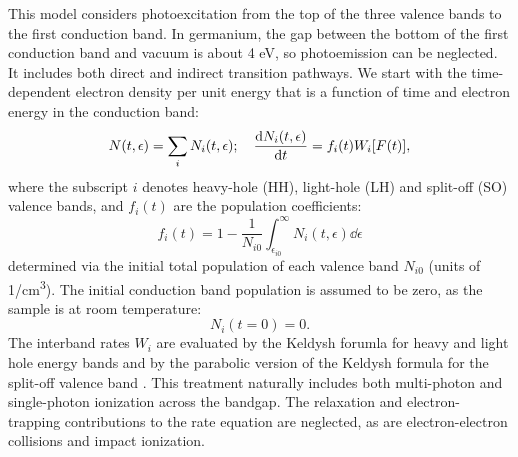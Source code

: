 This model considers photoexcitation from the top of the three valence bands to the first conduction band. In germanium, the gap between the bottom of the first conduction band and vacuum is about 4 eV, so photoemission can be neglected. It includes both direct and indirect transition pathways. We start with the time-dependent electron density per unit energy that is a function of time and electron energy in the conduction band:
\begin{equation}
N(t, \epsilon) = \sum_{i} N_i(t, \epsilon); \quad \dv{N_i(t, \epsilon)}{t} = f_i(t) W_i [F(t)],
\end{equation}
where the subscript $i$ denotes heavy-hole (HH), light-hole (LH) and split-off (SO) valence bands, and $f_i(t)$ are the population coefficients:
\begin{equation}
f_i(t) = 1 - \frac{1}{N_{i0}} \int_{\epsilon_{i0}}^{\infty} N_i(t,\epsilon) \dd{\epsilon}
\end{equation}
determined via the initial total population of each valence band $N_{i0}$ (units of 1/cm\textsuperscript{3}). The initial conduction band population is assumed to be zero, as the sample is at room temperature:
\begin{equation}
N_i(t=0)=0.
\end{equation}
The interband rates $W_i$ are evaluated by the Keldysh forumla for heavy and light hole energy bands \cite{keldyshIonizationFieldStrong1965} and by the parabolic version of the Keldysh formula for the split-off valence band \cite{gruzdevIonizationNanoparticlesSupershort2014}. This treatment naturally includes both multi-photon and single-photon ionization across the bandgap. The relaxation and electron-trapping contributions to the rate equation are neglected, as are electron-electron collisions and impact ionization.

